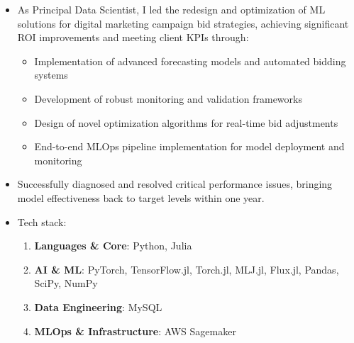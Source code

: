 {  
  \begin{itemize}
    \item As Principal Data Scientist, I led the redesign and optimization of ML solutions for digital marketing campaign bid strategies, achieving significant ROI improvements and meeting client KPIs through:
      \begin{itemize}
        \item Implementation of advanced forecasting models and automated bidding systems
        \item Development of robust monitoring and validation frameworks
        \item Design of novel optimization algorithms for real-time bid adjustments
        \item End-to-end MLOps pipeline implementation for model deployment and monitoring
      \end{itemize}
    \item Successfully diagnosed and resolved critical performance issues, bringing model effectiveness back to target levels within one year.
    \item Tech stack:
      \begin{enumerate}
        \item \textbf{Languages \& Core}: {\color{accent2}Python, Julia}
        \item \textbf{AI \& ML}: {\color{accent2}PyTorch, TensorFlow.jl, Torch.jl, MLJ.jl, Flux.jl, Pandas, SciPy, NumPy}
        \item \textbf{Data Engineering}: {\color{accent2}MySQL}
        \item \textbf{MLOps \& Infrastructure}: {\color{accent2}AWS Sagemaker}
      \end{enumerate}
  \end{itemize}

  \divider

}
